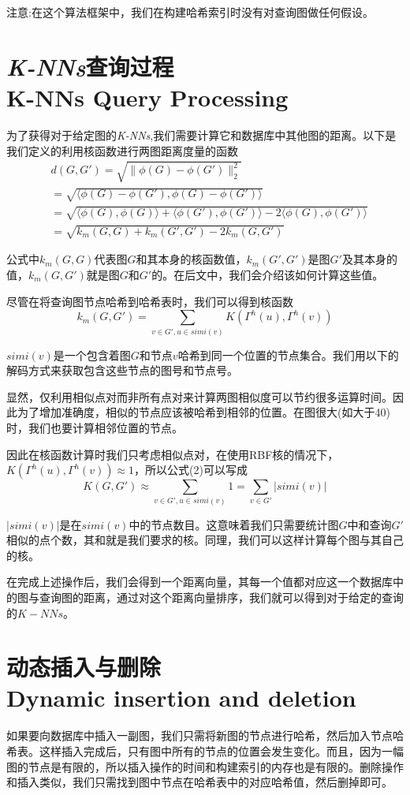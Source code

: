 \documentclass{article}
\begin{document}
注意:在这个算法框架中，我们在构建哈希索引时没有对查询图做任何假设。



\section{\emph{K-NNs}查询过程 \\ K-NNs Query Processing}
为了获得对于给定图的\emph{K-NNs},我们需要计算它和数据库中其他图的距离。以下是我们定义的利用核函数进行两图距离度量的函数
\begin{equation}
\begin{split}
    &d(G,G')=\sqrt{\|\phi(G)-\phi(G')\|_{2}^{2}}\\
              &=\sqrt{\langle\phi(G)-\phi(G'),\phi(G)-\phi(G')\rangle}\\
              &=\sqrt{\langle\phi(G),\phi(G)\rangle+\langle\phi(G'),\phi(G')\rangle-2\langle\phi(G),\phi(G')\rangle}\\
              &=\sqrt{k_{m}(G,G)+k_{m}(G',G')-2k_{m}(G,G')}
\end{split}
\end{equation}

公式中$k_{m}(G,G)$代表图$G$和其本身的核函数值，$k_{m}(G',G')$是图$G'$及其本身的值，$k_{m}(G,G')$就是图$G$和$G'$的。在后文中，我们会介绍该如何计算这些值。

尽管在将查询图节点哈希到哈希表时，我们可以得到核函数
\begin{equation}
k_{m}(G,G')=\sum_{v\in G',u\in simi(v)}K(\Gamma^{h}(u),\Gamma^{h}(v))
\end{equation}

$simi(v)$是一个包含着图$G$和节点$v$哈希到同一个位置的节点集合。我们用以下的解码方式来获取包含这些节点的图号和节点号。

显然，仅利用相似点对而非所有点对来计算两图相似度可以节约很多运算时间。因此为了增加准确度，相似的节点应该被哈希到相邻的位置。在图很大(如大于40)时，我们也要计算相邻位置的节点。

因此在核函数计算时我们只考虑相似点对，在使用RBF核的情况下，$K(\Gamma^{h}(u),\Gamma^{h}(v))\approx1$，所以公式(2)可以写成
\begin{equation}
    K(G,G')\approx\sum_{v\in G',u\in simi(v)}1=\sum_{v\in G'}|simi(v)| 
\end{equation}

$|simi(v)|$是在$simi(v)$中的节点数目。这意味着我们只需要统计图$G$中和查询$G'$相似的点个数，其和就是我们要求的核。同理，我们可以这样计算每个图与其自己的核。

在完成上述操作后，我们会得到一个距离向量，其每一个值都对应这一个数据库中的图与查询图的距离，通过对这个距离向量排序，我们就可以得到对于给定的查询的$K-NNs$。

\section{动态插入与删除 \\ Dynamic insertion and deletion}
如果要向数据库中插入一副图，我们只需将新图的节点进行哈希，然后加入节点哈希表。这样插入完成后，只有图中所有的节点的位置会发生变化。而且，因为一幅图的节点是有限的，所以插入操作的时间和构建索引的内存也是有限的。删除操作和插入类似，我们只需找到图中节点在哈希表中的对应哈希值，然后删掉即可。

\ifx\allfiles\undefined
\renewcommand\refname{参考文献}


\end{document}
